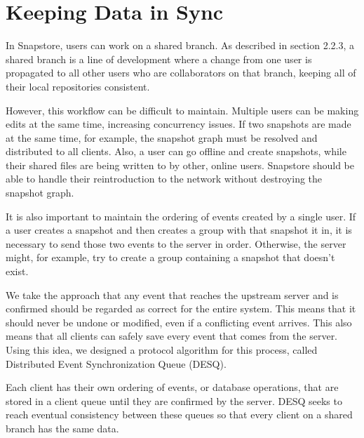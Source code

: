 \section{Keeping Data in Sync}

In Snapstore, users can work on a shared branch. As described in section 2.2.3, a shared branch is a line of development where a change from one user is propagated to all other users who are collaborators on that branch, keeping all of their local repositories consistent.

However, this workflow can be difficult to maintain. Multiple users can be making edits at the same time, increasing concurrency issues. If two snapshots are made at the same time, for example, the snapshot graph must be resolved and distributed to all clients. Also, a user can go offline and create snapshots, while their shared files are being written to by other, online users. Snapstore should be able to handle their reintroduction to the network without destroying the snapshot graph.

It is also important to maintain the ordering of events created by a single user. If a user creates a snapshot and then creates a group with that snapshot it in, it is necessary to send those two events to the server in order. Otherwise, the server might, for example, try to create a group containing a snapshot that doesn't exist.

We take the approach that any event that reaches the upstream server and is confirmed should be regarded as correct for the entire system. This means that it should never be undone or modified, even if a conflicting event arrives. This also means that all clients can safely save every event that comes from the server. Using this idea, we designed a protocol algorithm for this process, called Distributed Event Synchronization Queue (DESQ).

Each client has their own ordering of events, or database operations, that are stored in a client queue until they are confirmed by the server. DESQ seeks to reach eventual consistency between these queues so that every client on a shared branch has the same data.


